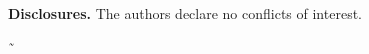 \documentclass[final,5p,times,twocolumn]{elsarticle}
\begin{document}
\noindent\textbf{Disclosures.} The authors declare no conflicts of interest.












˜
\end{document}
